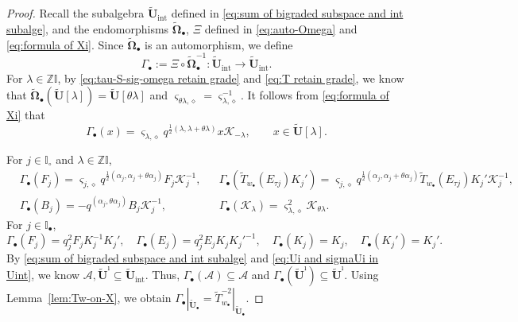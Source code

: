 \documentclass[a4paper,reqno,12pt]{amsart}
\numberwithin{equation}{section}
\theoremstyle{definition}
\theoremstyle{plain}
\theoremstyle{definition}
\def\Z{\mathbb Z}
\def\I{\mathbb I}
\def\bI{\I_\bullet}
\def\wI{\I_\circ}
\def\bw{w_\bullet}
\def\tU{\widetilde{\mathbf U}}
\def\tUi{\widetilde{\mathbf U}^{\imath}}
\def \tbU{\tU_{\bullet}}
\def\tTD{\widetilde T}
\def\cA{\mathcal A}
\def\cK{\mathcal K}
\def\vs{\varsigma}
\def\dm{\diamond}
\def \wObb{\widetilde{\mathbf{\Omega}}_\bullet}
\def \Gb{\Gamma_\bullet}
\begin{document}
\begin{proof}
    Recall the subalgebra $\tU_{\text{int}}$ defined in \eqref{eq:sum of bigraded subspace and int subalge}, and the endomorphisms $\wObb$, $\Xi$ defined in \eqref{eq:auto-Omega} and \eqref{eq:formula of Xi}. Since $\wObb$ is an automorphism, we define
    \begin{equation}\label{eq:def-Gamma}
        \Gamma_\bullet:=\Xi\circ\wObb^{-1}:\tU_{\text{int}}\longrightarrow\tU_{\text{int}}.
    \end{equation}
    For $\lambda\in\Z\I$, by \eqref{eq:tau-S-sig-omega retain grade} and \eqref{eq:T retain grade}, we know that $\wObb(\tU[\lambda])=\tU[\theta\lambda]$ and $\vs_{\theta\lambda,\dm}=\vs_{\lambda,\dm}^{-1}$. It follows from \eqref{eq:formula of Xi} that
    \begin{equation}\label{eq:formula of Gamma}
        \Gamma_\bullet(x)=\vs_{\lambda,\dm}q^{\frac12(\lambda,\lambda+\theta\lambda)}x\cK_{-\lambda},\qquad x\in\tU[\lambda].
    \end{equation}

    For $j\in\wI$ and $\lambda\in\Z\I$,
    \begin{equation}
        \begin{aligned}\label{eq:compute-1}
        &\Gb(F_j)=\vs_{j,\dm}q^{\frac12(\alpha_j,\alpha_j+\theta \alpha_j)}F_j\cK_j^{-1},&&\Gb(\tTD_{\bw}(E_{\tau j})K_j')=\vs_{j,\dm}q^{\frac12(\alpha_j,\alpha_j+\theta \alpha_j)}\tTD_{\bw}(E_{\tau j})K_j'\cK_j^{-1},\\
        &\Gb(B_j)=- q^{(\alpha_j,\theta \alpha_j)}B_j\cK_j^{-1},&&\Gb(\cK_\lambda)=\vs^2_{\lambda,\dm}\cK_{\theta\lambda}.
    \end{aligned}
    \end{equation}   
For $j\in\bI$, 
\begin{equation}\label{eq:compute-2}
    \Gb(F_j)=q_j^2F_jK_j^{-1}K_j',\quad \Gb(E_j)=q_j^2E_jK_jK_j'^{-1},\quad
    \Gb(K_j)=K_j,\quad \Gb(K_j')=K_j'.
\end{equation}
By \eqref{eq:sum of bigraded subspace and int subalge} and \eqref{eq:Ui and sigmaUi in Uint}, we know $\cA, \tUi\subseteq\tU_{\text{int}}$.
Thus, $\Gb(\cA)\subseteq\cA$ and $\Gb(\tUi)\subseteq\tUi$. Using Lemma~\ref{lem:Tw-on-X}, we obtain $\Gb|_{\tbU}=\tTD_{\bw}^{-2}|_{\tbU}$.


\end{proof}
\end{document}
